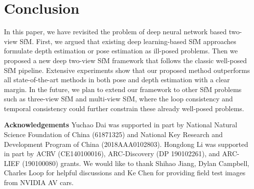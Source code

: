 \documentclass[final]{cvpr}
\begin{document}
\section{Conclusion}
In this paper, we have revisited the problem of deep neural network based two-view SfM. First, we argued that existing deep learning-based SfM approaches formulate depth estimation or pose estimation as ill-posed problems. Then we proposed a new deep two-view SfM framework that follows the classic well-posed SfM pipeline. Extensive experiments show that our proposed method outperforms all state-of-the-art methods in both pose and depth estimation with a clear margin. In the future, we plan to extend our framework to other SfM problems such as three-view SfM and multi-view SfM, where the loop consistency and temporal consistency could further constrain these already well-posed problems.



\small{
\noindent
\textbf{Acknowledgements}
Yuchao Dai was supported in part by National Natural Science Foundation of China (61871325) and National Key Research and Development Program of China (2018AAA0102803). Hongdong Li was supported in part by ACRV (CE140100016), ARC-Discovery (DP 190102261), and ARC-LIEF (190100080) grants. We would like to thank Shihao Jiang, Dylan Campbell, Charles Loop for helpful discussions and Ke Chen for providing field test images from NVIDIA AV cars.}




{\small


}
\end{document}
